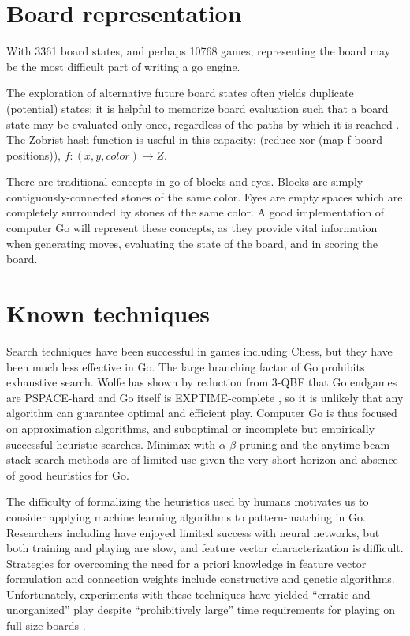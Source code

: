 \documentclass{memoir}
\begin{document}
\section{Board representation}
With 3361 board states, and perhaps 10768 games, representing the board may be the most difficult part of writing a go engine.

The exploration of alternative future board states often yields duplicate (potential) states; it is helpful to memorize board evaluation such that a board state may be evaluated only once, regardless of the paths by which it is reached \cite{Zobrist1970b}. The Zobrist hash function is useful in this capacity: (reduce xor (map f board-positions)), $f: (x, y, color) \rightarrow Z$.

There are traditional concepts in go of blocks and eyes. Blocks are simply contiguously-connected stones of the same color. Eyes are empty spaces which are completely surrounded by stones of the same color. A good implementation of computer Go will represent these concepts, as they provide vital information when generating moves, evaluating the state of the board, and in scoring the board. 

\section{Known techniques}
Search techniques have been successful in games including Chess, but they have been much less effective in Go. The large branching factor of Go prohibits exhaustive search. Wolfe has shown by reduction from 3-QBF that Go endgames are PSPACE-hard \cite{Wolfe} and Go itself is EXPTIME-complete \cite{Burmeister}, so it is unlikely that any algorithm can guarantee optimal and efficient play. Computer Go is thus focused on approximation algorithms, and suboptimal or incomplete but empirically successful heuristic searches. Minimax with $\alpha$-$\beta$ pruning and the anytime beam stack search methods are of limited use given the very short horizon and absence of good heuristics for Go.

The difficulty of formalizing the heuristics used by humans motivates us to consider applying machine learning algorithms to pattern-matching in Go. Researchers including \cite{Enzenberger96} have enjoyed limited success with neural networks, but both training and playing are slow, and feature vector characterization is difficult. Strategies for overcoming the need for a priori knowledge in feature vector formulation and connection weights include constructive and genetic algorithms. Unfortunately, experiments with these techniques have yielded ``erratic and unorganized'' play despite ``prohibitively large'' time requirements for playing on full-size boards \cite{RichardsMM98}.
\end{document}
